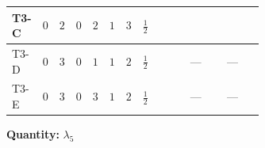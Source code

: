 \documentclass[8pt]{article}
\begin{document}
\begin{landscape}
\begin{longtable}{@{}llcccccc >{\raggedright\arraybackslash}p{0.21\linewidth} >{\raggedright\arraybackslash}p{0.21\linewidth} >{\raggedright\arraybackslash}p{0.21\linewidth}@{}}
\midrule
T3-C & $0$ & $2$ & $0$ & $2$ & $1$ & $3$ & $\frac{1}{2}$ & \scriptsize\adjustbox{max width=\linewidth}{$\begin{gathered} +4 {\lambda_{HS_2}^{(1)}} {\lambda_5}\end{gathered}$} & \scriptsize\adjustbox{max width=\linewidth}{$\begin{gathered} {\lambda_5} \left(6 \operatorname{Tr}\!\left({Y_d}\,\left({Y_d}\right)^{\dagger}\right)+2 \operatorname{Tr}\!\left({Y_e}\,\left({Y_e}\right)^{\dagger}\right)+6 \operatorname{Tr}\!\left({Y_u}\,\left({Y_u}\right)^{\dagger}\right)+\frac{{\lambda_{12}^{(A)}}}{6}+\frac{2 {\lambda_{HS_1}^{(A)}}}{3}+2 {\lambda_{HS_2}^{(A)}}\right)\end{gathered}$} & \scriptsize\adjustbox{max width=\linewidth}{$\begin{gathered} -9 {g_2}^2 {\lambda_5}\end{gathered}$} \\
\midrule
T3-D & $0$ & $3$ & $0$ & $1$ & $1$ & $2$ & $\frac{1}{2}$ & \scriptsize\adjustbox{max width=\linewidth}{$\begin{gathered} +4 {\lambda_{HS_2}^{(1)}} {\lambda_5}\end{gathered}$} & --- & --- \\
\midrule
T3-E & $0$ & $3$ & $0$ & $3$ & $1$ & $2$ & $\frac{1}{2}$ & \scriptsize\adjustbox{max width=\linewidth}{$\begin{gathered} +4 {\lambda_{HS_2}^{(1)}} {\lambda_5}\end{gathered}$} & --- & --- \\
\midrule
\bottomrule
\end{longtable}
\clearpage
\noindent\textbf{Quantity: }$\lambda_5$\par\smallskip

\end{landscape}
\end{document}

